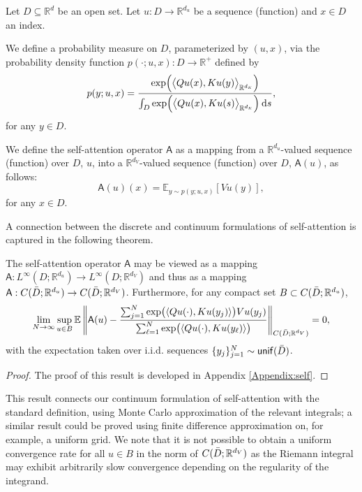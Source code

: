 \documentclass[twoside]{article}
\newcommand{\1}{\mathbbm{1}}
\newcommand{\R}{\mathbbm{R}}
\newcommand{\sA}{\mathsf{A}}
\newcommand{\dK}{d_\textrm{\scalebox{.7}{$K$}}}
\providecommand{\mathbbm}{\mathbb} %
\newcommand{\E}{\mathbb{E}}
\newcommand{\unif}{\mathsf{unif}}
\begin{document}
Let $D \subseteq \R^d$ be an open set. Let $u: D \to \R^{d_u}$ be a sequence (function) and $x \in D$ an index.

\begin{definition}
\label{d:3}
We define a probability measure on $D$, parameterized by $(u,x)$, via the probability density function
$p(\cdot;u,x): D \to \R^+$ defined by
\[p(y; u, x) = \frac{\mathrm{exp} \Big ( \big\langle Q u(x), K u(y) \big\rangle_{\R^{\dK}} \Big )}{\int_D \mathrm{exp} \Big ( \big\langle Q u(x), K u(s) \big\rangle_{\R^{\dK}} \Big ) \: \mathrm{d}s},\]
for any $y \in D$.
\end{definition}

\begin{definition}
\label{d:4}
We define the self-attention operator $\sA$ as a mapping from a $\R^{d_u}$-valued sequence (function) over $D$, $u$, into a $\R^{d_V}$-valued sequence (function) over $D$, $\sA(u)$, as follows:
\[\sA(u)(x) = \E_{y \sim p(y;u,x)} [V u(y)],\]
for any $x\in D$.
\end{definition}


A connection between the discrete and continuum formulations of self-attention is captured in the following theorem.


\begin{theorem}
\label{thm:self_attention_limit}
The self-attention operator $\sA$ may be viewed as a mapping \(\sA : L^{\infty} (D;\R^{d_u}) \to L^{\infty} (D;\R^{d_V})\)
and thus as a mapping
\(\sA : C (\Bar{D};\R^{d_u}) \to C (\Bar{D};\R^{d_V})\). Furthermore, for any compact set \(B \subset C(\Bar{D};\R^{d_u})\),
\[ \lim_{N \to \infty} \sup_{u \in B} \E \left \| \sA(u) - \frac{\sum_{j=1}^N \mathrm{exp} \big ( \langle Qu(\cdot), Ku(y_j)  \rangle \big ) V u(y_j)}{\sum_{\ell=1}^N \mathrm{exp} \big ( \langle Qu(\cdot), Ku(y_\ell)  \rangle \big )} \right \|_{C(\Bar{D};\R^{d_V})}  = 0,\]
with the expectation taken over i.i.d. sequences \(\{y_j\}_{j=1}^N \sim \unif(\Bar{D})\).
\end{theorem}

\begin{proof}
    The proof of this result is developed in Appendix \ref{Appendix:self}.
\end{proof}

\begin{remark}
This result connects our continuum formulation of self-attention with the standard definition, using
Monte Carlo approximation of the relevant integrals; a similar result could be proved using finite
difference approximation on, for example, a uniform grid. We note that it is not possible to obtain a uniform convergence rate for all $u\in B$ in the norm of $C(\Bar{D};\mathbb{R}^{d_V})$ as the Riemann integral may exhibit arbitrarily slow convergence depending on the regularity of the integrand.
\end{remark}
\end{document}
